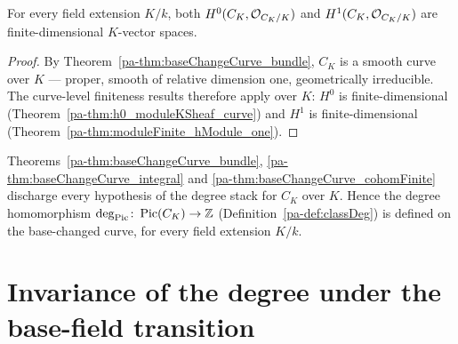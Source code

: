 \begin{theorem}
  \label{pa-thm:baseChangeCurve_cohomFinite}
  \leanok

  For every field extension \(K/k\), both \(H^0(C_K, \mathcal{O}_{C_K/K})\) and \(H^1(C_K,
  \mathcal{O}_{C_K/K})\) are finite-dimensional \(K\)-vector spaces.
\end{theorem}
\begin{proof}
  \leanok
  By Theorem~\ref{pa-thm:baseChangeCurve_bundle}, \(C_K\) is a smooth curve over \(K\) --- proper,
  smooth of relative dimension one, geometrically irreducible. The curve-level finiteness results
  therefore apply over \(K\): \(H^0\) is finite-dimensional
  (Theorem~\ref{pa-thm:h0_moduleKSheaf_curve}) and \(H^1\) is finite-dimensional
  (Theorem~\ref{pa-thm:moduleFinite_hModule_one}).
\end{proof}

\begin{remark}
  \label{pa-rem:classDeg_baseChange}
  Theorems~\ref{pa-thm:baseChangeCurve_bundle}, \ref{pa-thm:baseChangeCurve_integral} and
  \ref{pa-thm:baseChangeCurve_cohomFinite} discharge every hypothesis of the degree stack for \(C_K\)
  over \(K\). Hence the degree homomorphism \(\deg_{\operatorname{Pic}} \colon \operatorname{Pic}(C_K) \to \mathbb{Z}\)
  (Definition~\ref{pa-def:classDeg}) is defined on the base-changed curve, for every field extension
  \(K/k\).
\end{remark}

\section{Invariance of the degree under the base-field transition}
\label{pa-sec:degree_base_field_invariance}

